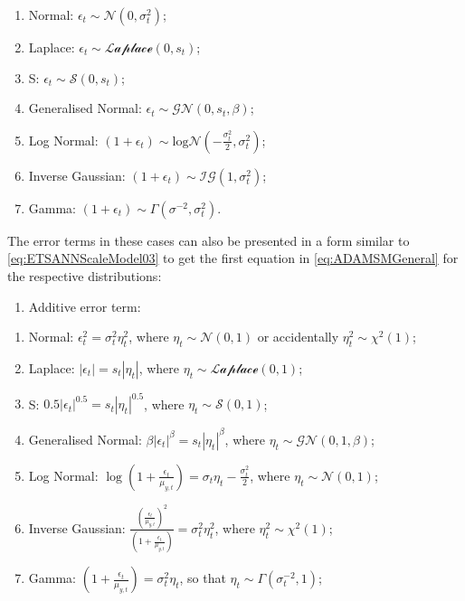 \documentclass[]{book}
\providecommand{\tightlist}{%
  \setlength{\itemsep}{0pt}\setlength{\parskip}{0pt}}
\theoremstyle{definition}
\theoremstyle{definition}
\theoremstyle{definition}
\theoremstyle{definition}
\theoremstyle{remark}
\begin{document}
\begin{enumerate}
\def\labelenumi{\alph{enumi}.}
\tightlist
\item
  Normal: \(\epsilon_t \sim \mathcal{N}(0, \sigma_t^2)\);
\item
  Laplace: \(\epsilon_t \sim \mathcal{Laplace}(0, s_t)\);
\item
  S: \(\epsilon_t \sim \mathcal{S}(0, s_t)\);
\item
  Generalised Normal: \(\epsilon_t \sim \mathcal{GN}(0, s_t, \beta)\);
\item
  Log Normal: \(\left(1+\epsilon_t \right) \sim \mathrm{log}\mathcal{N}\left(-\frac{\sigma_t^2}{2}, \sigma_t^2\right)\);
\item
  Inverse Gaussian: \(\left(1+\epsilon_t \right) \sim \mathcal{IG}(1, \sigma_t^2)\);
\item
  Gamma: \(\left(1+\epsilon_t \right) \sim \Gamma (\sigma^{-2}, \sigma_t^2)\).
\end{enumerate}

The error terms in these cases can also be presented in a form similar to \eqref{eq:ETSANNScaleModel03} to get the first equation in \eqref{eq:ADAMSMGeneral} for the respective distributions:

\begin{enumerate}
\def\labelenumi{\arabic{enumi}.}
\tightlist
\item
  Additive error term:
\end{enumerate}

\begin{enumerate}
\def\labelenumi{\alph{enumi}.}
\tightlist
\item
  Normal: \(\epsilon_t^2 = \sigma_t^2 \eta_t^2\), where \(\eta_t \sim \mathcal{N}(0, 1)\) or accidentally \(\eta_t^2 \sim \chi^2(1)\);
\item
  Laplace: \(|\epsilon_t| = s_t |\eta_t|\), where \(\eta_t \sim \mathcal{Laplace}(0, 1)\);
\item
  S: \(0.5 |\epsilon_t|^{0.5} = s_t |\eta_t|^{0.5}\), where \(\eta_t \sim \mathcal{S}(0, 1)\);
\item
  Generalised Normal: \(\beta |\epsilon_t|^{\beta} = s_t |\eta_t|^{\beta}\), where \(\eta_t \sim \mathcal{GN}(0, 1, \beta)\);
\item
  Log Normal: \(\log\left(1+\frac{\epsilon_t}{\mu_{y,t}} \right) = \sigma_t \eta_t-\frac{\sigma_t^2}{2}\), where \(\eta_t \sim \mathcal{N}(0, 1)\);
\item
  Inverse Gaussian: \(\frac{\left(\frac{\epsilon_t}{\mu_{y,t}} \right)^2}{\left(1+\frac{\epsilon_t}{\mu_{y,t}} \right)}=\sigma^2_t \eta_t^2\), where \(\eta_t^2 \sim \chi^2(1)\);
\item
  Gamma: \(\left(1+\frac{\epsilon_t}{\mu_{y,t}} \right) = \sigma_t^2 \eta_t\), so that \(\eta_t \sim \mathcal{\Gamma}(\sigma_t^{-2}, 1)\);
\end{enumerate}
\end{document}
